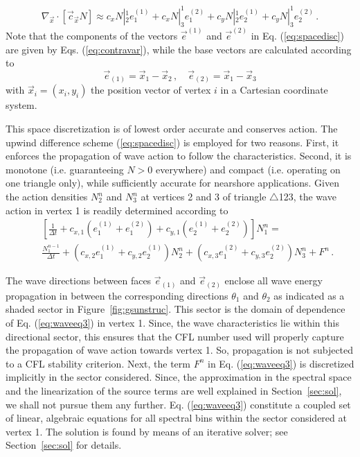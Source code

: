\documentclass[12pt]{book}
\begin{document}
\begin{equation}
  \nabla_{\vec{x}} \cdot [\vec{c}_{\vec{x}} N] \approx c_x N|_2^1 e^{(1)}_1 + c_x N|_3^1 e^{(2)}_1 + c_y N|_2^1 e^{(1)}_2 + c_y N|_3^1 e^{(2)}_2 \, .
  \label{eq:spacedisc}
\end{equation}
Note that the components of the vectors ${\vec{e}}^{(1)}$ and ${\vec{e}}^{(2)}$ in Eq. (\ref{eq:spacedisc}) are given by Eqs. (\ref{eq:contravar}), while
the base vectors are calculated according to
\begin{equation}
  {\vec{e}}_{(1)}  = {\vec{x}}_1 - {\vec{x}}_2 \, , \quad {\vec{e}}_{(2)}  = {\vec{x}}_1 - {\vec{x}}_3
  \label{eq:basevec}
\end{equation}
with ${\vec{x}}_i = (x_i, y_i)$ the position vector of vertex $i$ in a Cartesian coordinate system.

This space discretization is of lowest order accurate and conserves action. The upwind difference scheme (\ref{eq:spacedisc}) is employed for two reasons.
First, it enforces the propagation of wave action to follow the characteristics.
Second, it is monotone (i.e. guaranteeing $N > 0$ everywhere) and compact (i.e. operating on one triangle only), while sufficiently accurate for nearshore applications.
Given the action densities $N^n_2$ and $N^n_3$ at vertices 2 and 3 of triangle $\triangle$123,
the wave action in vertex 1 is readily determined according to
\begin{eqnarray}
  &&\left[ \frac{1}{\Delta t} + c_{x,1} \left( e^{(1)}_1 + e^{(2)}_1 \right) + c_{y,1} \left( e^{(1)}_2 + e^{(2)}_2 \right) \right] N_1^n = \nonumber \\
  &&\frac{N_1^{n-1}}{\Delta t}+\left( c_{x,2} e^{(1)}_1 + c_{y,2} e^{(1)}_2 \right) N^n_2 + \left( c_{x,3} e^{(2)}_1 + c_{y,3} e^{(2)}_2 \right) N^n_3 + F^n \, .
  \label{eq:waveeq3}
\end{eqnarray}

The wave directions between faces $\vec{e}_{(1)}$ and $\vec{e}_{(2)}$ enclose all wave energy propagation in between the corresponding directions $\theta_1$ and $\theta_2$ as
indicated as a shaded sector in Figure~\ref{fig:gsunstruc}.
This sector is the domain of dependence of Eq. (\ref{eq:waveeq3}) in vertex 1.
Since, the wave characteristics lie within this directional sector, this ensures that the CFL number
used will properly capture the propagation of wave action towards vertex 1. So, propagation is not subjected to a CFL stability criterion.
Next, the term $F^n$ in Eq. (\ref{eq:waveeq3}) is discretized implicitly in the sector considered.
Since, the approximation in the spectral space and the linearization of the source terms are well explained in Section~\ref{sec:sol}, we shall not pursue them any further.
Eq. (\ref{eq:waveeq3}) constitute a coupled set of linear, algebraic equations for all spectral bins within the sector considered at vertex 1. The solution is found by means
of an iterative solver; see Section~\ref{sec:sol} for details.
\end{document}
